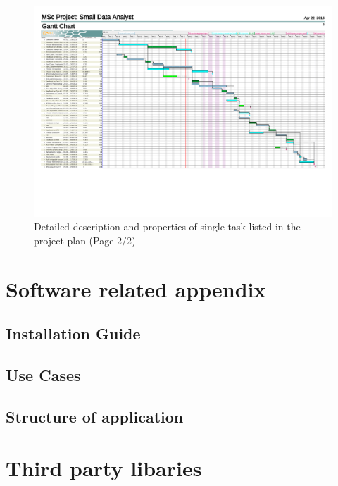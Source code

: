 \begin{figure}
	\centering
	\includegraphics[page=3,width=\textwidth]{appendix/Projectplan.pdf}
	\caption{Detailed description and properties of single task listed in the project plan (Page 2/2)}
	\label{fig:projectplan:details:2}
\end{figure}


\section{Software related appendix}
\subsection{Installation Guide}
\label{app:installation}

\subsection{Use Cases}
\label{app:use_cases}

\subsection{Structure of application}
\label{app:structure}

\section{Third party libaries}
\label{app:3rdparty}